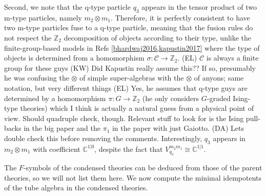 \documentclass[12pt,a4paper]{article}
\newcounter{arrow}
\newcommand{\tp}{\otimes}
\newcommand{\ra}{\rightarrow}
\newcommand{\mcc}{\mathcal{C}}
\newcommand{\zt}{\mathbb{Z}_2}
\newcommand{\dave}[1]{{\color{ao(english)}\footnotesize{(DA) #1}}}
\newcommand{\ethan}[1]{{\color{amethyst}\footnotesize{(EL) #1}}}
\newcommand{\kw}[1]{{\color{kwcolor}\footnotesize{(KW) #1}}}
\begin{document}
Second, we note that the q-type particle $q_3$ appears in the tensor product of two m-type 
particles, namely $m_2 \tp m_1$. 
Therefore, it is perfectly consistent to have two m-type particles fuse to a q-type particle, meaning 
that the fusion rules do not respect the $\zt$ 
decomposition of objects according to their type, 
unlike the finite-group-based models in Refs \ref{bhardwaj2016,kapustin2017} where the type of objects is determined 
from a homomorphism $\sigma : \mcc \ra \zt$. \ethan{$\mcc$ is always a finite group for these guys}
\kw{Did Kapustin really assume this??  If so, presumably he was confusing the $\tp$ of simple super-algebras with the $\tp$ of anyons; same notation,
but very different things}
\ethan{Yes, he assumes that q-type guys are determined by a homomorphism $\pi : G \ra \zt$ (he only considers $G$-graded Ising-type theories) which I think is actually a natural guess from a physical point of view. Should quadruple check, though. Relevant stuff to look for is the Ising pull-backs in the big paper and the $\pi_1$ in the paper with just Gaiotto.}
\dave{Lets double check this before removing the comments.}
Interestingly, $q_3$ appears in $m_2 \tp m_1$ with coefficient $\mathbb{C}^{1|0}$, despite the fact that $V^{m_2 m_1}_{q_3} \cong \mathbb{C}^{1|1}$.

The $F$-symbols of the condensed theories can be deduced from those of the parent theories, so we will not list them here.
We now compute the minimal idempotents of the tube algebra in the condensed theories.
\end{document}
